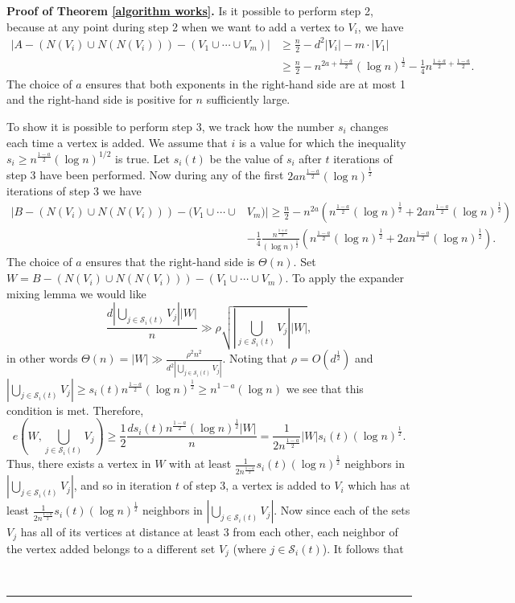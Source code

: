 \documentclass[12pt]{article}%
\newenvironment{proof}[1][Proof]{\noindent\textbf{#1.} }
{\hfill \ \rule{0.5em}{0.5em}}
\begin{document}
\begin{proof}[Proof of Theorem \ref{algorithm works}] Is it possible to perform step 2, because at any point during step 2 when we want to add a vertex to $V_i$, we have
$$
\begin{aligned}
    |A-(N(V_i)\cup N(N(V_i)))-(V_1\cup\cdots\cup V_m)|&\ge\frac{n}{2}-d^2|V_i|-m\cdot|V_1|\\ &\ge \frac{n}{2}-n^{2a+\frac{1-a}{2}}(\log n)^{\frac{1}{2}}-\frac{1}{4}n^{\frac{1+a}{2}+\frac{1-a}{2}}.
\end{aligned}$$
The choice of $a$ ensures that both exponents in the right-hand side are at most 1 and the right-hand side is positive for $n$ sufficiently large.

To show it is possible to perform step 3, we track how the number $s_i$ changes each time a vertex is added. 
We assume that $i$ is a value for which the inequality 
$s_i \geq n^{ \frac{1-a}{2} } ( \log n )^{1/2}$
is true.  
Let $s_i(t)$ be the value of $s_i$ after $t$ iterations of step 3 have been performed. Now during any of the first $2an^{\frac{1-a}{2}}(\log n)^{\frac{1}{2}}$ iterations of step 3 we have
$$\begin{aligned}|B-(N(V_i)\cup N(N(V_i)))-(V_1\cup\cdots\cup& V_m)|\ge  \frac{n}{2}-n^{2a}(n^\frac{1-a}{2}(\log n)^{\frac{1}{2}}+2an^{\frac{1-a}{2}}(\log n)^{\frac{1}{2}})\\
&-\frac{1}{4}\frac{n^{\frac{1+a}{2}}}{(\log n)^{\frac{1}{2}}}(n^\frac{1-a}{2}(\log n)^{\frac{1}{2}}+2an^{\frac{1-a}{2}}(\log n)^{\frac{1}{2}}).\end{aligned}$$
The choice of $a$ ensures that the right-hand side is $\Theta(n)$. Set $W=B-(N(V_i)\cup N(N(V_i)))-(V_1\cup\cdots\cup V_m)$. To apply the expander mixing lemma we would like
$$\frac{d\left|\bigcup_{j\in\mathcal S_i(t)}V_j\right||W|}{n}\gg\rho\sqrt{\left|\bigcup_{j\in\mathcal S_i(t)}V_j\right||W|},$$
in other words $\Theta(n)=|W|\gg\frac{\rho^2n^2}{d^2\left|\bigcup_{j\in\mathcal S_i(t)}V_j\right|}$. Noting that 
$\rho= O (d^{\frac{1}{2}})$ 
and $\left|\bigcup_{j\in\mathcal S_i(t)}V_j\right|\ge s_i(t)n^{\frac{1-a}{2}}(\log n)^{\frac{1}{2}}\ge n^{1-a}(\log n)$ we see that this condition is met. Therefore,
$$e\left(W,\bigcup_{j\in\mathcal S_i(t)}V_j\right)\ge\frac{1}{2}\frac{ds_i(t)n^{\frac{1-a}{2}}(\log n)^{\frac{1}{2}}|W|}{n}=\frac{1}{2n^\frac{1-a}{2}}|W|s_i(t)(\log n)^{\frac{1}{2}}.$$
Thus, there exists a vertex in $W$ with at least $\frac{1}{2n^\frac{1-a}{2}}s_i(t)(\log n)^{\frac{1}{2}}$ neighbors in $\left|\bigcup_{j\in\mathcal S_i(t)}V_j\right|$, and so in iteration $t$ of step 3, a vertex is added to $V_i$ which has at least $\frac{1}{2n^{\frac{1-a}{2}}}s_i(t)(\log n)^{\frac{1}{2}}$ neighbors in $\left|\bigcup_{j\in\mathcal S_i(t)}V_j\right|$. Now since each of the sets $V_j$ has all of its vertices at distance at least 3 from each other, each neighbor of the vertex added belongs to a different set $V_j$ (where $j\in\mathcal S_i(t)$). It follows that

\end{proof}
\end{document}
